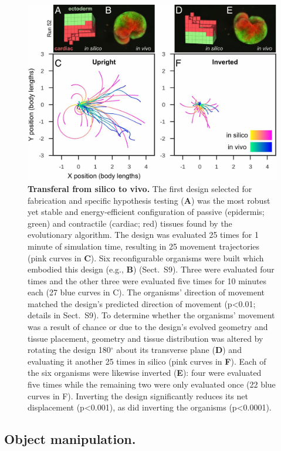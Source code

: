 \begin{figure}[!ht]
\centering
\includegraphics[width=\linewidth]{Chapter07/img/F4.large.jpg}
\caption{\textbf{Transferal from silico to vivo.} The first design selected for fabrication and specific hypothesis testing (\textbf{A}) was the most robust yet stable and energy-efficient configuration of passive (epidermis; green) and contractile (cardiac; red) tissues found by the evolutionary algorithm. The design was evaluated 25 times for 1 minute of simulation time, resulting in 25 movement trajectories (pink curves in \textbf{C}). Six reconfigurable organisms were built which embodied this design (e.g., \textbf{B}) (Sect.~S9). Three were evaluated four times and the other three were evaluated five times for 10 minutes each (27 blue curves in C). The organisms' direction of movement matched the design's predicted direction of movement (p<0.01; details in Sect.~S9). To determine whether the organisms' movement was a result of chance or due to the design's evolved geometry and tissue placement, geometry and tissue distribution was altered by rotating the design 180{$^{\circ}$} about its transverse plane (\textbf{D}) and evaluating it another 25 times in silico (pink curves in \textbf{F}). Each of the six organisms were likewise inverted (\textbf{E}): four were evaluated five times while the remaining two were only evaluated once (22 blue curves in F). Inverting the design significantly reduces its net displacement (p<0.001), as did inverting the organisms (p<0.0001).}
\end{figure}


\subsection*{Object manipulation.}  

